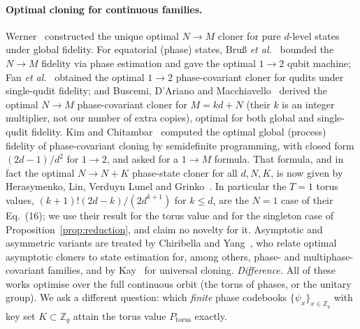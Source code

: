 \documentclass[11pt]{article}
\theoremstyle{definition}
\theoremstyle{remark}
\begin{document}
\paragraph{Optimal cloning for continuous families.}
Werner~\cite{Werner1998} constructed the unique optimal $N\to M$ cloner for pure $d$-level states under global fidelity.
For equatorial (phase) states, Bru\ss{} \emph{et al.}~\cite{Bruss2000} bounded the $N\to M$ fidelity via phase estimation and gave the optimal $1\to2$ qubit machine;
Fan \emph{et al.}~\cite{Fan2003} obtained the optimal $1\to2$ phase-covariant cloner for qudits under single-qudit fidelity;
and Buscemi, D'Ariano and Macchiavello~\cite{Buscemi2005} derived the optimal $N\to M$ phase-covariant cloner for $M=kd+N$ (their $k$ is an integer multiplier, not our number of extra copies), optimal for both global and single-qudit fidelity.
Kim and Chitambar~\cite{KimChitambar2022} computed the optimal global (process) fidelity of phase-covariant cloning by semidefinite programming, with closed form $(2d-1)/d^{2}$ for $1\to2$, and asked for a $1\to M$ formula.
That formula, and in fact the optimal $N\to N+K$ phase-state cloner for all $d,N,K$, is now given by Herasymenko, Lin, Verduyn Lunel and Grinko~\cite[Thm.~II.3 and Thm.~X.1, Eq.~(16)]{Herasymenko2026}.
In particular the $T=1$ torus values, $(k+1)!(2d-k)/(2d^{k+1})$ for $k\le d$, are the $N=1$ case of their Eq.~(16); we use their result for the torus value and for the singleton case of Proposition~\ref{prop:reduction}, and claim no novelty for it.
Asymptotic and asymmetric variants are treated by Chiribella and Yang~\cite{ChiribellaYang2014}, who relate optimal asymptotic cloners to state estimation for, among others, phase- and multiphase-covariant families, and by Kay~\cite{Kay2016} for universal cloning.
\emph{Difference.} All of these works optimise over the full continuous orbit (the torus of phases, or the unitary group).
We ask a different question: which \emph{finite} phase codebooks $\{\psi_x\}_{x\in\mathbb{Z}_q}$ with key set $K\subset\mathbb{Z}_q$ attain the torus value $P_{\mathrm{torus}}$ exactly.
\end{document}
